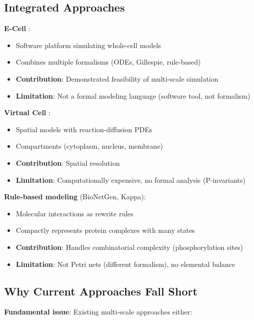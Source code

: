 \subsection{Integrated Approaches}
\label{subsec:integrated-approaches}

\textbf{E-Cell} \citep{Tomita1999}:

\begin{itemize}
    \item Software platform simulating whole-cell models
    \item Combines multiple formalisms (ODEs, Gillespie, rule-based)
    \item \textbf{Contribution}: Demonstrated feasibility of multi-scale simulation
    \item \textbf{Limitation}: Not a formal modeling language (software tool, not formalism)
\end{itemize}

\textbf{Virtual Cell} \citep{Schaff1997}:

\begin{itemize}
    \item Spatial models with reaction-diffusion PDEs
    \item Compartments (cytoplasm, nucleus, membrane)
    \item \textbf{Contribution}: Spatial resolution
    \item \textbf{Limitation}: Computationally expensive, no formal analysis (P-invariants)
\end{itemize}

\textbf{Rule-based modeling} (BioNetGen, Kappa):

\begin{itemize}
    \item Molecular interactions as rewrite rules
    \item Compactly represents protein complexes with many states
    \item \textbf{Contribution}: Handles combinatorial complexity (phosphorylation sites)
    \item \textbf{Limitation}: Not Petri nets (different formalism), no elemental balance
\end{itemize}

\subsection{Why Current Approaches Fall Short}
\label{subsec:multiscale-shortcomings}

\textbf{Fundamental issue}: Existing multi-scale approaches either:

